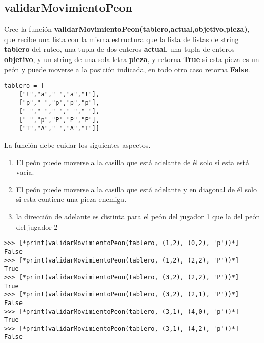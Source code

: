 \subsection*{validarMovimientoPeon}

Cree la función \textbf{validarMovimientoPeon(tablero,actual,objetivo,pieza)}, que recibe una lista con la misma estructura que la lista de listas de string \textbf{tablero} del ruteo, una tupla de dos enteros \textbf{actual}, una tupla de enteros \textbf{objetivo}, y un string de una sola letra \textbf{pieza}, y retorna \textbf{True} si esta pieza es un peón y puede moverse a la posición indicada, en todo otro caso retorna \textbf{False}.

\begin{lstlisting}[style=consola]
tablero = [
    ["t","a"," ","a","t"],
    ["p"," ","p","p","p"],
    [" "," "," "," "," "],
    [" ","p","P","P","P"],
    ["T","A"," ","A","T"]]
\end{lstlisting}


La función debe cuidar los siguientes aspectos.
\begin{enumerate}
    \item El peón puede moverse a la casilla que está adelante de él solo si esta está vacía.
    \item El peón puede moverse a la casilla que está adelante y en diagonal de él solo si esta contiene una pieza enemiga.
    \item la dirección de adelante es distinta para el peón del jugador 1 que la del peón del jugador 2
\end{enumerate}



\begin{lstlisting}[style=consola]
>>> [*print(validarMovimientoPeon(tablero, (1,2), (0,2), 'p'))*]
False
>>> [*print(validarMovimientoPeon(tablero, (1,2), (2,2), 'P'))*]
True
>>> [*print(validarMovimientoPeon(tablero, (3,2), (2,2), 'P'))*]
True
>>> [*print(validarMovimientoPeon(tablero, (3,2), (2,1), 'P'))*]
False
>>> [*print(validarMovimientoPeon(tablero, (3,1), (4,0), 'p'))*]
True
>>> [*print(validarMovimientoPeon(tablero, (3,1), (4,2), 'p'))*]
False
\end{lstlisting}


